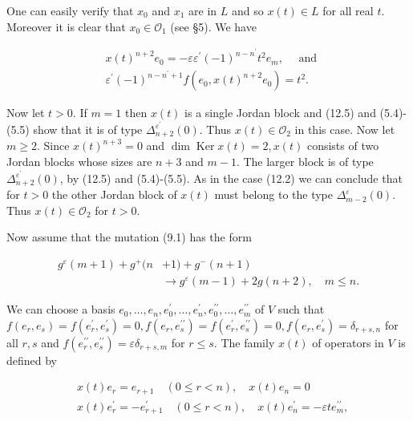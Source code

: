 \documentclass[10pt]{article}
\begin{document}
One can easily verify that $x_{0}$ and $x_{1}$ are in $L$ and so $x(t) \in L$ for all real $t$. Moreover it is clear that $x_{0} \in \mathcal{O}_{1}$ (see §5). We have


\begin{align*}
& x(t)^{n+2} e_{0}=-\varepsilon \varepsilon^{\prime}(-1)^{n-n^{\prime}} t^{2} e_{m}, \quad \text { and } \\
& \varepsilon^{\prime}(-1)^{n-n^{\prime}+1} f\left(e_{0}, x(t)^{n+2} e_{0}\right)=t^{2} . \tag{12.5}
\end{align*}


Now let $t>0$. If $m=1$ then $x(t)$ is a single Jordan block and (12.5) and (5.4)-(5.5) show that it is of type $\Delta_{n+2}^{\varepsilon^{\prime}}(0)$. Thus $x(t) \in \mathcal{O}_{2}$ in this case. Now let $m \geqslant 2$. Since $x(t)^{n+3}=0$ and $\operatorname{dim} \operatorname{Ker} x(t)=2, x(t)$ consists of two Jordan blocks whose sizes are $n+3$ and $m-1$. The larger block is of type $\Delta_{n+2}^{\varepsilon^{\prime}}(0)$, by (12.5) and (5.4)-(5.5). As in the case (12.2) we can conclude that for $t>0$ the other Jordan block of $x(t)$ must belong to the type $\Delta_{m-2}^{\varepsilon}(0)$. Thus $x(t) \in \mathcal{O}_{2}$ for $t>0$.

Now assume that the mutation (9.1) has the form


\begin{align*}
g^{\varepsilon}(m+1)+g^{+}(n & +1)+g^{-}(n+1) \\
& \rightarrow g^{\varepsilon}(m-1)+2 g(n+2), \quad m \leqslant n . \tag{12.6}
\end{align*}


We can choose a basis $e_{0}, \ldots, e_{n}, e_{0}^{\prime}, \ldots, e_{n}^{\prime}, e_{0}^{\prime \prime}, \ldots, e_{m}^{\prime \prime}$ of $V$ such that $f\left(e_{r}, e_{s}\right)=f\left(e_{r}^{\prime}, e_{s}^{\prime}\right)=0, f\left(e_{r}, e_{s}^{\prime \prime}\right)=f\left(e_{r}^{\prime}, e_{s}^{\prime \prime}\right)=0, f\left(e_{r}, e_{s}^{\prime}\right)=\delta_{r+s, n}$ for all $r, s$ and $f\left(e_{r}^{\prime \prime}, e_{s}^{\prime \prime}\right)=\varepsilon \delta_{r+s, m}$ for $r \leqslant s$. The family $x(t)$ of operators in $V$ is defined by

$$
\begin{aligned}
& x(t) e_{r}=e_{r+1} \quad(0 \leqslant r<n), \quad x(t) e_{n}=0 \\
& x(t) e_{r}^{\prime}=-e_{r+1}^{\prime} \quad(0 \leqslant r<n), \quad x(t) e_{n}^{\prime}=-\varepsilon t e_{m}^{\prime \prime},
\end{aligned}
$$
\end{document}
